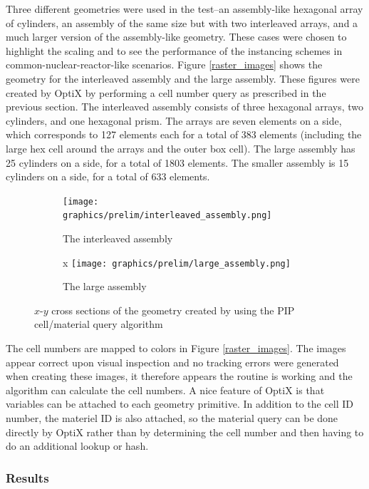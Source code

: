 Three different geometries were used in the test--an assembly-like hexagonal array of cylinders, an assembly of the same size but with two interleaved arrays, and a much larger version of the assembly-like geometry. These cases were chosen to highlight the scaling%
 and to see the performance of the instancing schemes in common-nuclear-reactor-like scenarios.  Figure \ref{raster_images} shows the geometry for the interleaved assembly and the large assembly.  These figures were created by OptiX by performing a cell number query as prescribed in the previous section.  The interleaved assembly consists of three hexagonal arrays, two cylinders, and one hexagonal prism.  The arrays are seven elements on a side, which corresponds to 127 elements each for a total of 383 elements (including the large hex cell around the arrays and the outer box cell).  The large assembly has 25 cylinders on a side, for a total of 1803 elements.  The smaller assembly is 15 cylinders on a side, for a total of 633 elements.

\begin{figure}[h!]
\centering
\begin{subfigure}{.5\textwidth}
  \centering
  \texttt{[image: graphics/prelim/interleaved\_assembly.png]}
  \caption{The interleaved assembly}
  \label{fig:sub1}
\end{subfigure}%
\begin{subfigure}{.5\textwidth}x
  \centering
  \texttt{[image: graphics/prelim/large\_assembly.png]}
  \caption{The large assembly}
  \label{fig:sub2}
\end{subfigure}
\caption{$x$-$y$ cross sections of the geometry created by using the PIP cell/material query algorithm \label{raster_images}}
\label{fig:test}
\end{figure}

The cell numbers are mapped to colors in Figure \ref{raster_images}. The images appear correct upon visual inspection and no tracking errors were generated when creating these images, it therefore appears the routine is working and the algorithm can calculate the cell numbers.  A nice feature of OptiX is that variables can be attached to each geometry primitive.  In addition to the cell ID number, the materiel ID is also attached, so the material query can be done directly by OptiX rather than by determining the cell number and then having to do an additional lookup or hash.

\subsubsection{Results}

